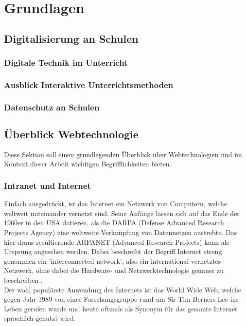 \section{Grundlagen}\label{sec:grundlagen}
\subsection{Digitalisierung an Schulen}
\subsubsection{Digitale Technik im Unterricht}\label{sec:technikunterricht}
\subsubsection{Ausblick Interaktive Unterrichtsmethoden}\label{sec:interaktiveunterr}
\subsubsection{Datenschutz an Schulen}\label{sec:datenschutz}

\subsection{Überblick Webtechnologie}\label{sec:webbasedsoftware}
Diese Sektion soll einen grundlegenden Überblick über Webtechnologien und im Kontext dieser Arbeit wichtigen Begrifflichkeiten bieten. 

\subsubsection{Intranet und Internet}\label{sec:intranetundinternet}
Einfach ausgedrückt, ist das Internet ein Netzwerk von Computern, welche weltweit miteinander vernetzt sind. Seine Anfänge lassen sich auf das Ende der 1960er in den USA datieren, als die DARPA (Defense Advanced Research Projects Agency) eine weltweite Verknüpfung von Datennetzen anstrebte. Das hier draus resultierende ARPANET (Advanced Research Projects) kann als Ursprung angesehen werden. Dabei beschreibt der Begriff Internet streng genommen ein 'interconnected network', also ein international vernetztes Netzwerk, ohne dabei die Hardware- und Netzwerktechnologie genauer zu beschreiben \cite{safran2011webtechnologien}.  \\ 
Der wohl populärste Anwendung des Internets ist das World Wide Web, welche gegen Jahr 1989 von einer Forschungsgruppe rund um Sir Tim Berners-Lee ins Leben gerufen wurde und heute oftmals als Synonym für das gesamte Internet sprachlich genutzt wird. \\ 

